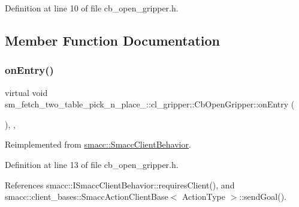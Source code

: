 Definition at line 10 of file cb\+\_\+open\+\_\+gripper.\+h.



\subsection{Member Function Documentation}
\mbox{\label{classsm__fetch__two__table__pick__n__place__1_1_1cl__gripper_1_1CbOpenGripper_a08f95a8f05e33c1a04b77fa5f3465d78}} 
\subsubsection{\texorpdfstring{on\+Entry()}{onEntry()}}
{\footnotesize\ttfamily virtual void sm\+\_\+fetch\+\_\+two\+\_\+table\+\_\+pick\+\_\+n\+\_\+place\+\_\+::cl\+\_\+gripper\+::\+Cb\+Open\+Gripper\+::on\+Entry (\begin{DoxyParamCaption}{ }\end{DoxyParamCaption})\hspace{0.3cm}{\ttfamily [inline]}, {\ttfamily [override]}, {\ttfamily [virtual]}}



Reimplemented from \hyperlink{classsmacc_1_1SmaccClientBehavior_ad5d3e1f1697c3cfe66c94cadba948493}{smacc\+::\+Smacc\+Client\+Behavior}.



Definition at line 13 of file cb\+\_\+open\+\_\+gripper.\+h.



References smacc\+::\+I\+Smacc\+Client\+Behavior\+::requires\+Client(), and smacc\+::client\+\_\+bases\+::\+Smacc\+Action\+Client\+Base$<$ Action\+Type $>$\+::send\+Goal().


